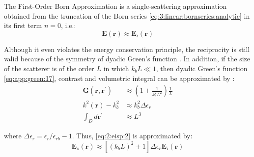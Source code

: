 			The First-Order Born Approximation is a single-scattering approximation obtained from the truncation of the Born series \eqref{eq:3:linear:bornseries:analytic} in its first term $n = 0$, i.e.:
			\begin{equation}
				\mathbf{E}(\mathbf{r}) \approx \mathbf{E}_i(\mathbf{r}) \label{eq:3:linear:bornapproximation}
			\end{equation}		
			
			
			Although it even violates the energy conservation principle, the reciprocity is still valid because of the symmetry of dyadic Green's function \citep{chew1995}. In addition, if the size of the scatterer is of the order $L$ in which $k_bL \ll 1$, then dyadic Green's function \eqref{eq:app:green:17}, contrast and volumetric integral can be approximated by \citep{chew1995}:
			\begin{align}
				\mathbf{\bar{G}}(\mathbf{r},\mathbf{r^\prime}) &\approx \left(1+\frac{1}{k_b^2L^2}\right)\frac{1}{L} \label{eq:3:linear:bornapproximation:1} \\
				k^2(\mathbf{r})-k_b^2 &\approx k_b^2\Delta\epsilon_r \label{eq:3:linear:bornapproximation:2} \\
				\int_D d\mathbf{r^\prime} &\approx L^3 \label{eq:3:linear:bornapproximation:3}
			\end{align}
			
			\noindent where $\Delta\epsilon_r = \epsilon_r/\epsilon_{rb} - 1$. Thus, \eqref{eq:2:eisp:2} is approximated by:
			\begin{equation}
				\mathbf{E}_s(\mathbf{r}) \approx \left[(k_bL)^2+1\right]\Delta\epsilon_r\mathbf{E}_i(\mathbf{r}) \label{eq:3:linear:bornapproximation:4}
			\end{equation}
		
